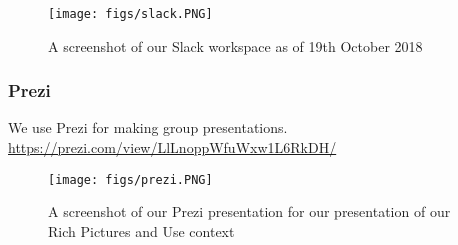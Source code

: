 \begin{figure}[h!]
  \centering
  \texttt{[image: figs/slack.PNG]}
  \caption{A screenshot of our Slack workspace as of 19th October 2018}
  \label{slack}
\end{figure}



\subsubsection{ Prezi }

We use Prezi for making group presentations.
\url{https://prezi.com/view/LlLnoppWfuWxw1L6RkDH/}

\begin{figure}[h!]
  \centering
  \texttt{[image: figs/prezi.PNG]}
  \caption{A screenshot of our Prezi presentation for our presentation of our Rich Pictures and Use context}
  \label{prezi}
\end{figure}


